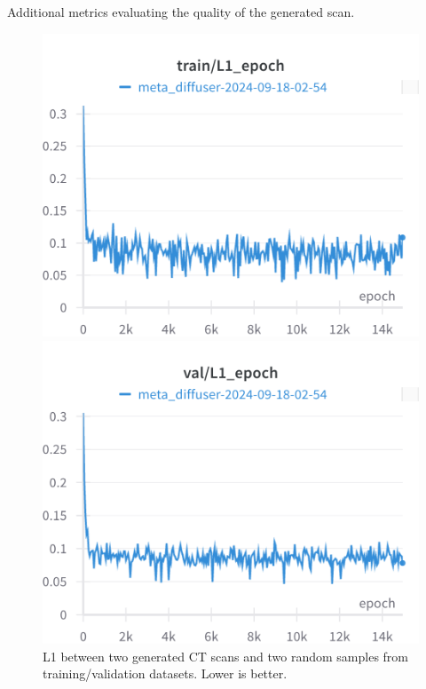 Additional metrics evaluating the quality of the generated scan.
\begin{figure}[H]
\includegraphics[width=\linewidth]{detailed_engineering/Meta Diffusion/charts/train_l1_epoch.png}

\endminipage\hfill
{}
\includegraphics[width=\linewidth]{detailed_engineering/Meta Diffusion/charts/val_l1_epoch.png}

\endminipage
\caption{L1 between two generated CT scans and two random samples from training/validation datasets. Lower is better.}
\end{figure}

